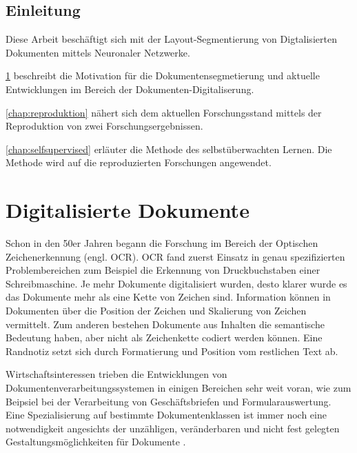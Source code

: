 

\section*{Einleitung}
Diese Arbeit beschäftigt sich mit der Layout-Segmentierung von Digtalisierten Dokumenten mittels Neuronaler Netzwerke.

\cref{chap:documents} beschreibt die Motivation für die Dokumentensegmetierung und aktuelle Entwicklungen im
Bereich der Dokumenten-Digitaliserung.

\cref{chap:reproduktion} nähert sich dem aktuellen Forschungsstand mittels der Reproduktion von zwei Forschungsergebnissen.

\cref{chap:selfsupervised} erläuter die Methode des selbstüberwachten Lernen. Die Methode wird auf die reproduzierten Forschungen angewendet.

\chapter{Digitalisierte Dokumente}
\label{chap:documents}


% 
Schon in den 50er Jahren begann die Forschung im Bereich der Optischen Zeichenerkennung 
(engl. OCR)\autocite{DoermannHandbookdocumentimage2014}. OCR fand zuerst Einsatz in genau 
spezifizierten Problembereichen zum Beispiel die Erkennung von Druckbuchstaben einer Schreibmaschine. 
Je mehr Dokumente digitalisiert wurden, desto klarer wurde es das Dokumente mehr als 
eine Kette von Zeichen sind. 
Information können in Dokumenten über die Position der Zeichen und Skalierung von Zeichen vermittelt.
Zum anderen bestehen Dokumente aus Inhalten die semantische Bedeutung haben, aber nicht als Zeichenkette codiert werden können. 
Eine Randnotiz setzt sich durch Formatierung und Position vom restlichen Text ab. 

Wirtschaftsinteressen trieben die Entwicklungen von Dokumentenverarbeitungssystemen in einigen Bereichen sehr weit voran, wie 
zum Beipsiel bei der Verarbeitung von Geschäftsbriefen und Formularauswertung.
Eine Spezialisierung auf bestimmte Dokumentenklassen ist immer noch eine notwendigkeit angesichts der unzähligen, veränderbaren und nicht fest gelegten Gestaltungsmöglichkeiten für Dokumente \autocite[69]{BairdEvolutionDocumentImage2014}.


